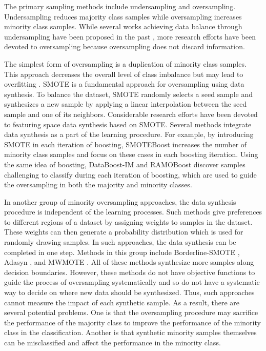 \documentclass{iitthesis}
\begin{document}
The primary sampling methods include undersampling and oversampling. Undersampling reduces majority class samples while oversampling increases minority class samples. While several works achieving data balance through undersampling have been proposed in the past \cite{liu2009exploratory}\cite{ZJMI03}, more research efforts have been devoted to oversampling because oversampling does not discard information.

The simplest form of oversampling is a duplication of minority class samples. This approach decreases the overall level of class imbalance but may lead to overfitting \cite{Drummond03c4.5}. SMOTE \cite{CNV:02} is a fundamental approach for oversampling using data synthesis. To balance the dataset, SMOTE randomly selects a seed sample and synthesizes a new sample by applying a linear interpolation between the seed sample and one of its neighbors. Considerable research efforts have been devoted to featuring space data synthesis based on SMOTE. Several methods integrate data synthesis as a part of the learning procedure. For example, by introducing SMOTE in each iteration of boosting, SMOTEBoost \cite{chawla2003smoteboost} increases the number of minority class samples and focus on these cases in each boosting iteration. Using the same idea of boosting, DataBoost-IM \cite{guo2004learning} and RAMOBoost \cite{chen2010ramoboost} discover samples challenging to classify during each iteration of boosting, which are used to guide the oversampling in both the majority and minority classes. 

In another group of minority oversampling approaches, the data synthesis procedure is independent of the learning processes. Such methods give preferences to different regions of a dataset by assigning weights to samples in the dataset. These weights can then generate a probability distribution which is used for randomly drawing samples. In such approaches, the data synthesis can be completed in one step. Methods in this group include Borderline-SMOTE \cite{HH:05}, Adasyn \cite{HH:08}, \cite{barua2011novel} and MWMOTE \cite{barua2014mwmote}. All of these methods synthesize more samples along decision boundaries. However, these methods do not have objective functions to guide the process of oversampling systematically and so do not have a systematic way to decide on where new data should be synthesized. Thus, such approaches cannot measure the impact of each synthetic sample. As a result, there are several potential problems. One is that the oversampling procedure may sacrifice the performance of the majority class to improve the performance of the minority class in the classification. Another is that synthetic minority samples themselves can be misclassified and affect the performance in the minority class.
\end{document}

